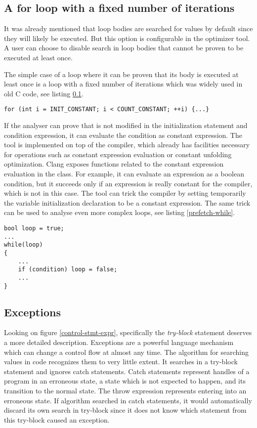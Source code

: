 \subsection{A for loop with a fixed number of iterations}
\label{prefetch-for}
It was already mentioned that loop bodies are searched for values by default since they will likely be executed. But this option is configurable in the optimizer tool. A user can choose to disable search in loop bodies that cannot be proven to be executed at least once.

The simple case of a loop where it can be proven that its body is executed at least once is a  loop with a fixed number of iterations which was widely used in old C code, see listing \ref{prefetch-for}.

\begin{lstlisting}[caption={A \code{for} loop with a constant number of iterations.}, label={prefetch-for}]
for (int i = INIT_CONSTANT; i < COUNT_CONSTANT; ++i) {...}
\end{lstlisting}

If the analyser can prove that  is not modified in the initialization statement and condition expression, it can evaluate the condition as constant expression. The tool is implemented on top of the compiler, which already has facilities necessary for operations such as constant expression evaluation or constant unfolding optimization. Clang exposes functions related to the constant expression evaluation in the  class. For example, it can evaluate an expression as a boolean condition, but it succeeds only if an expression is really constant for the compiler, which is not in this case. The tool can trick the compiler by setting temporarily the variable initialization declaration to be a constant expression. The same trick can be used to analyse even more complex loops, see listing \ref{prefetch-while}.

\begin{lstlisting}[caption={An example of a more complex loop with at least one body execution.}, label={prefetch-while}]
bool loop = true;
...
while(loop)
{
    ...
    if (condition) loop = false;
    ...
}
\end{lstlisting}

\subsection{Exceptions}
Looking on figure \ref{control-stmt-expr}, specifically the \emph{try-block} statement deserves a more detailed description. Exceptions are a powerful language mechanism which can change a control flow at almost any time. The algorithm for searching values in code recognizes them to very little extent. It searches in a try-block statement and ignores catch statements. Catch statements represent handles of a program in an erroneous state, a state which is not expected to happen, and its transition to the normal state. The throw expression represents entering into an erroneous state. If algorithm searched in catch statements, it would automatically discard its own search in try-block since it does not know which statement from this try-block caused an exception.

